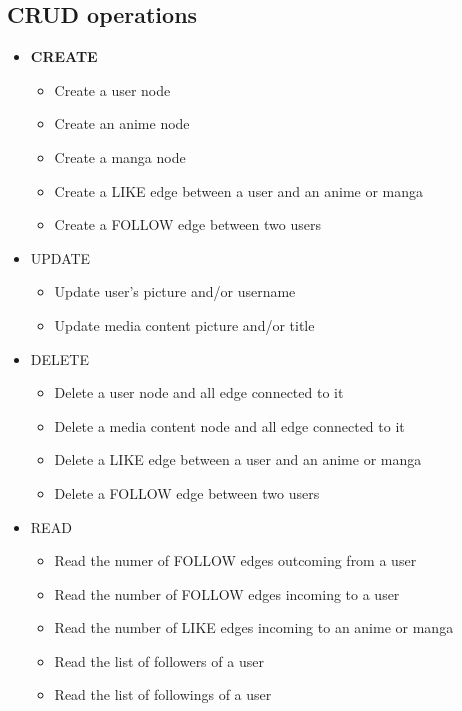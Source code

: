 \subsection*{CRUD operations}
\begin{itemize}
  \item \textbf{CREATE}
  \begin{itemize}
      \item Create a user node
      \item Create an anime node
      \item Create a manga node
      \item Create a LIKE edge between a user and an anime or manga
      \item Create a FOLLOW edge between two users
  \end{itemize}

  \item{UPDATE}
  \begin{itemize}
      \item Update user's picture and/or username
      \item Update media content picture and/or title
  \end{itemize}

  \item{DELETE}
  \begin{itemize}
      \item Delete a user node and all edge connected to it
      \item Delete a media content node and all edge connected to it
      \item Delete a LIKE edge between a user and an anime or manga
      \item Delete a FOLLOW edge between two users
  \end{itemize}

  \item{READ}
  \begin{itemize}
    \item Read the numer of FOLLOW edges outcoming from a user
    \item Read the number of FOLLOW edges incoming to a user
    \item Read the number of LIKE edges incoming to an anime or manga
    \item Read the list of followers of a user
    \item Read the list of followings of a user
  \end{itemize}
\end{itemize}

